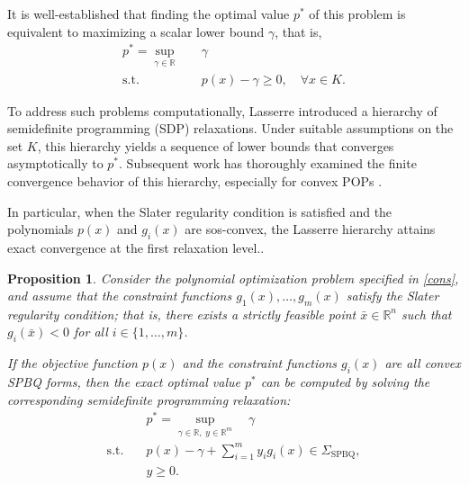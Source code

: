 \documentclass[12pt]{elsarticle}
\newtheorem{proposition}{Proposition}
\theoremstyle{definition}
\begin{document}
It is well-established that finding the optimal value $p^*$ of this problem is equivalent to maximizing a scalar lower bound $\gamma$, that is,
\begin{equation}
\begin{aligned}
p^* = \sup_{\gamma \in \mathbb{R}} \quad & \gamma \\
\text{s.t.} \quad & p(x) - \gamma \ge 0, \quad \forall x \in K.
\end{aligned}
\end{equation}

To address such problems computationally, Lasserre \cite{lasserre2001global} introduced a hierarchy of semidefinite programming (SDP) relaxations. Under suitable assumptions on the set $K$, this hierarchy yields a sequence of lower bounds that converges asymptotically to $p^*$. Subsequent work has thoroughly examined the finite convergence behavior of this hierarchy, especially for convex POPs \cite{de2011lasserre, lasserre2009convexity}.

In particular, when the Slater regularity condition is satisfied and the polynomials $p(x)$ and $g_i(x)$ are sos-convex, the Lasserre hierarchy attains exact convergence at the first relaxation level.\cite{lasserre2009convexity}.

\begin{proposition}\label{prop:spbq_opt}
Consider the polynomial optimization problem specified in \eqref{cons}, and assume that the constraint functions $g_1(x), \dots, g_m(x)$ satisfy the Slater regularity condition; that is, there exists a strictly feasible point $\bar{x} \in \mathbb{R}^n$ such that $g_i(\bar{x}) < 0$ for all $i \in \{1, \dots, m\}$. 

If the objective function $p(x)$ and the constraint functions $g_i(x)$ are all convex SPBQ forms, then the exact optimal value $p^*$ can be computed by solving the corresponding semidefinite programming relaxation:
\begin{equation}\label{cons spbq}
\begin{aligned}
&p^* = \sup_{\gamma \in \mathbb{R}, \; y \in \mathbb{R}^m} \quad  \gamma \\
\text{s.t.} \quad 
& p(x) - \gamma + \sum_{i=1}^m y_i g_i(x) \in \Sigma_{\text{SPBQ}}, \\
& y \ge 0.
\end{aligned}
\end{equation}
\end{proposition}
\end{document}
